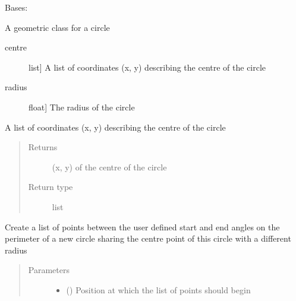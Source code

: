 \documentclass[letterpaper,10pt,english]{sphinxmanual}
\begin{document}
\begin{fulllineitems}
\label{\detokenize{source/pyzones:pyzones.Circle}}
Bases: {\hyperref[\detokenize{source/pyzones:pyzones.Shape}]{}}

A geometric class for a circle
\begin{description}
\item[{centre}] \leavevmode{[}list{]}
A list of coordinates (x, y) describing the centre of the circle

\item[{radius}] \leavevmode{[}float{]}
The radius of the circle

\end{description}

\begin{fulllineitems}
\label{\detokenize{source/pyzones:pyzones.Circle.centre}}
A list of coordinates (x, y) describing the centre of the circle
\begin{quote}\begin{description}
\item[{Returns}] \leavevmode
(x, y) of the centre of the circle

\item[{Return type}] \leavevmode
list

\end{description}\end{quote}

\end{fulllineitems}


\begin{fulllineitems}
\label{\detokenize{source/pyzones:pyzones.Circle.get_circular_points}}
Create a list of points between the user defined start and end angles on the perimeter of a new circle sharing
the centre point of this circle with a different radius
\begin{quote}\begin{description}
\item[{Parameters}] \leavevmode\begin{itemize}
\item {} 
 () \textendash{} Position at which the list of points should begin


\end{itemize}
\end{description}
\end{quote}
\end{fulllineitems}
\end{fulllineitems}
\end{document}
